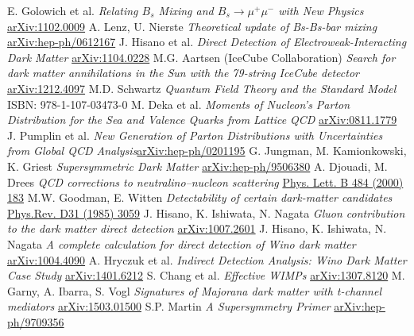 \begin{thebibliography}{xxx}
 E. Golowich et al. \textit{Relating $B_s$ Mixing and $B_s \rightarrow \mu^+ \mu^-$ with New Physics} \href{https://arxiv.org/abs/1102.0009}{arXiv:1102.0009}
 A. Lenz, U. Nierste \textit{Theoretical update of Bs-Bs-bar mixing} \href{https://arxiv.org/abs/hep-ph/0612167}{arXiv:hep-ph/0612167}
  J. Hisano et al. \textit{Direct Detection of Electroweak-Interacting Dark Matter} \href{https://arxiv.org/abs/1104.0228v2}{arXiv:1104.0228}
 M.G. Aartsen (IceCube Collaboration) \textit{Search for dark matter annihilations in the Sun with the 79-string IceCube detector} \href{https://arxiv.org/abs/1212.4097}{arXiv:1212.4097}
 M.D. Schwartz \textit{Quantum Field Theory and the Standard Model} ISBN: 978-1-107-03473-0
 M. Deka et al. \textit{Moments of Nucleon's Parton Distribution for the Sea and Valence Quarks from Lattice QCD} \href{https://arxiv.org/abs/0811.1779}{arXiv:0811.1779}
 J. Pumplin et al. \textit{New Generation of Parton Distributions with Uncertainties from Global QCD Analysis}\href{https://arxiv.org/abs/hep-ph/0201195}{arXiv:hep-ph/0201195}
 G. Jungman, M. Kamionkowski, K. Griest \textit{Supersymmetric Dark Matter} \href{https://arxiv.org/abs/hep-ph/9506380}{arXiv:hep-ph/9506380}
 A. Djouadi, M. Drees \textit{QCD corrections to neutralino–nucleon scattering} \href{http://www.sciencedirect.com/science/journal/03702693/484}{Phys. Lett. B 484 (2000) 183}
 M.W. Goodman, E. Witten \textit{Detectability of certain dark-matter candidates} \href{http://journals.aps.org/prd/abstract/10.1103/PhysRevD.31.3059} {Phys.Rev. D31 (1985) 3059}
 J. Hisano, K. Ishiwata, N. Nagata \textit{Gluon contribution to the dark matter direct detection}  \href{https://arxiv.org/abs/1007.2601}{arXiv:1007.2601}
 J. Hisano, K. Ishiwata, N. Nagata \textit{A complete calculation for direct detection of Wino dark matter}  \href{https://arxiv.org/abs/1004.4090}{arXiv:1004.4090}
 A. Hryczuk et al. \textit{Indirect Detection Analysis: Wino Dark Matter Case Study} \href{https://arxiv.org/abs/1401.6212v2}{arXiv:1401.6212}
 S. Chang et al. \textit{Effective WIMPs}  \href{https://arxiv.org/abs/1307.8120}{arXiv:1307.8120}
 M. Garny, A. Ibarra, S. Vogl \textit{Signatures of Majorana dark matter with t-channel mediators} \href{https://arxiv.org/abs/1503.01500}{arXiv:1503.01500}
 S.P. Martin \textit{A Supersymmetry Primer} \href{https://arxiv.org/abs/hep-ph/9709356}{arXiv:hep-ph/9709356}

\end{thebibliography}
